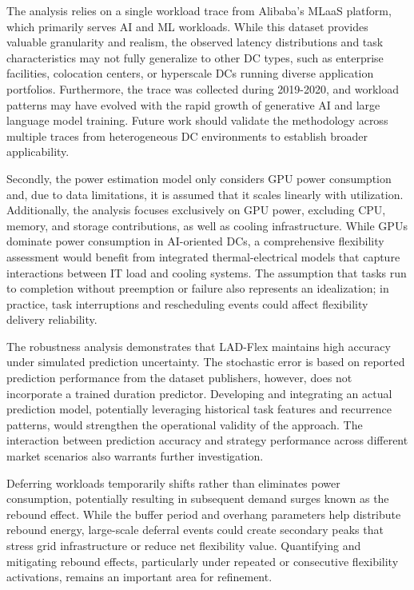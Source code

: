 \documentclass[preprint,12pt]{elsarticle}
\begin{document}
The analysis relies on a single workload trace from Alibaba's MLaaS platform, which primarily serves AI and ML workloads. While this dataset provides valuable granularity and realism, the observed latency distributions and task characteristics may not fully generalize to other DC types, such as enterprise facilities, colocation centers, or hyperscale DCs running diverse application portfolios. Furthermore, the trace was collected during 2019-2020, and workload patterns may have evolved with the rapid growth of generative AI and large language model training. Future work should validate the methodology across multiple traces from heterogeneous DC environments to establish broader applicability.

Secondly, the power estimation model only considers GPU power consumption and, due to data limitations, it is assumed that it scales linearly with utilization. Additionally, the analysis focuses exclusively on GPU power, excluding CPU, memory, and storage contributions, as well as cooling infrastructure. While GPUs dominate power consumption in AI-oriented DCs, a comprehensive flexibility assessment would benefit from integrated thermal-electrical models that capture interactions between IT load and cooling systems. The assumption that tasks run to completion without preemption or failure also represents an idealization; in practice, task interruptions and rescheduling events could affect flexibility delivery reliability.

The robustness analysis demonstrates that LAD-Flex maintains high accuracy under simulated prediction uncertainty. The stochastic error is based on reported prediction performance from the dataset publishers, however, does not incorporate a trained duration predictor. Developing and integrating an actual prediction model, potentially leveraging historical task features and recurrence patterns, would strengthen the operational validity of the approach. The interaction between prediction accuracy and strategy performance across different market scenarios also warrants further investigation.

Deferring workloads temporarily shifts rather than eliminates power consumption, potentially resulting in subsequent demand surges known as the rebound effect. While the buffer period and overhang parameters help distribute rebound energy, large-scale deferral events could create secondary peaks that stress grid infrastructure or reduce net flexibility value. Quantifying and mitigating rebound effects, particularly under repeated or consecutive flexibility activations, remains an important area for refinement.
\end{document}
